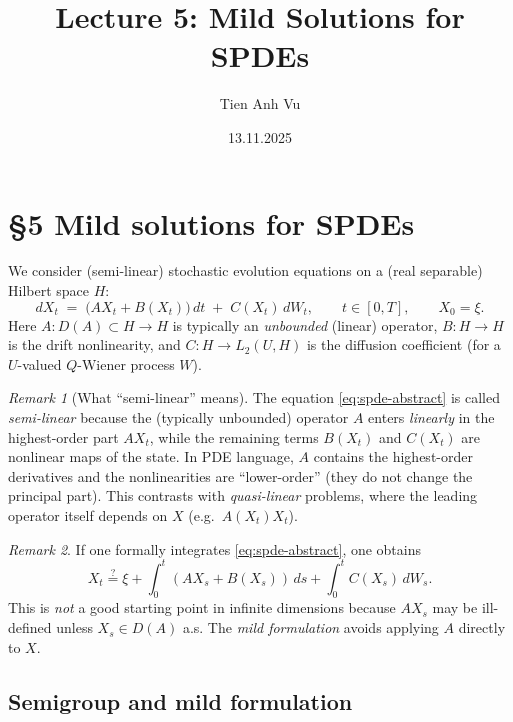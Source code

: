 \documentclass[11pt]{article}
\title{Lecture 5: Mild Solutions for SPDEs}
\date{13.11.2025}
\author{Tien Anh Vu}
\theoremstyle{definition}
\theoremstyle{remark}
\newtheorem{remark}{Remark}
\begin{document}
\maketitle

\section*{\S 5 Mild solutions for SPDEs}

We consider (semi-linear) stochastic evolution equations on a (real separable) Hilbert space $H$:
\begin{equation}\label{eq:spde-abstract}
    dX_t
    \;=\;
    \bigl(AX_t + B(X_t)\bigr)\,dt
    \;+\;
    C(X_t)\,dW_t,
    \qquad t \in [0,T],
    \qquad X_0 = \xi.
\end{equation}
Here $A \colon D(A) \subset H \to H$ is typically an \emph{unbounded} (linear) operator, $B \colon H \to H$ is the drift nonlinearity,
and $C \colon H \to L_2(U,H)$ is the diffusion coefficient (for a $U$-valued $Q$-Wiener process $W$).

\begin{remark}[What ``semi-linear'' means]
The equation \eqref{eq:spde-abstract} is called \emph{semi-linear} because the (typically unbounded) operator $A$ enters \emph{linearly} in the highest-order part $AX_t$,
while the remaining terms $B(X_t)$ and $C(X_t)$ are nonlinear maps of the state.
In PDE language, $A$ contains the highest-order derivatives and the nonlinearities are ``lower-order'' (they do not change the principal part).
This contrasts with \emph{quasi-linear} problems, where the leading operator itself depends on $X$ (e.g.\ $A(X_t)X_t$).
\end{remark}

\begin{remark}
If one formally integrates \eqref{eq:spde-abstract}, one obtains
\[
    X_t
    \stackrel{?}{=}
    \xi
    + \int_0^t (AX_s + B(X_s))\,ds
    + \int_0^t C(X_s)\,dW_s.
\]
This is \emph{not} a good starting point in infinite dimensions because $AX_s$ may be ill-defined unless $X_s \in D(A)$ a.s.
The \emph{mild formulation} avoids applying $A$ directly to $X$.
\end{remark}

\subsection*{Semigroup and mild formulation}
\end{document}
